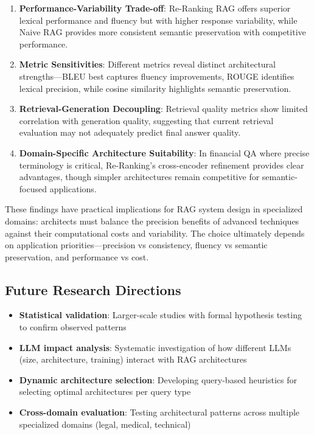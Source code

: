 \documentclass[11pt]{article}
\begin{document}
\begin{enumerate}
    \item \textbf{Performance-Variability Trade-off}: Re-Ranking RAG offers 
    superior lexical performance and fluency but with higher response variability, 
    while Naive RAG provides more consistent semantic preservation with 
    competitive performance.
    
    \item \textbf{Metric Sensitivities}: Different metrics reveal distinct 
    architectural strengths—BLEU best captures fluency improvements, 
    ROUGE identifies lexical precision, while cosine similarity highlights 
    semantic preservation.
    
    \item \textbf{Retrieval-Generation Decoupling}: Retrieval quality 
    metrics show limited correlation with generation quality, suggesting 
    that current retrieval evaluation may not adequately predict final 
    answer quality.
    
    \item \textbf{Domain-Specific Architecture Suitability}: In financial 
    QA where precise terminology is critical, Re-Ranking's cross-encoder 
    refinement provides clear advantages, though simpler architectures 
    remain competitive for semantic-focused applications.
\end{enumerate}

These findings have practical implications for RAG system design in 
specialized domains: architects must balance the precision benefits of 
advanced techniques against their computational costs and variability. 
The choice ultimately depends on application priorities—precision vs 
consistency, fluency vs semantic preservation, and performance vs cost.

\subsection{Future Research Directions}

\begin{itemize}
    \item \textbf{Statistical validation}: Larger-scale studies with formal 
    hypothesis testing to confirm observed patterns
    \item \textbf{LLM impact analysis}: Systematic investigation of how different 
    LLMs (size, architecture, training) interact with RAG architectures
    \item \textbf{Dynamic architecture selection}: Developing query-based 
    heuristics for selecting optimal architectures per query type
    \item \textbf{Cross-domain evaluation}: Testing architectural patterns 
    across multiple specialized domains (legal, medical, technical)
\end{itemize}
\end{document}
